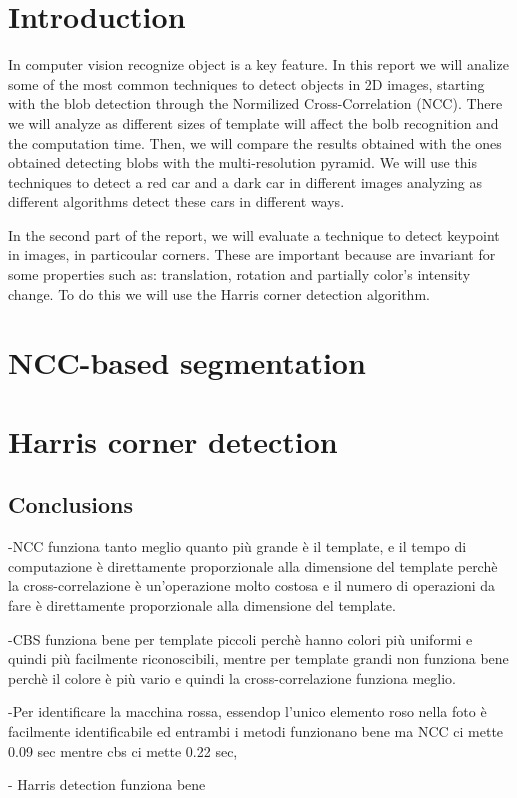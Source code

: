\chapter*{Introduction}

In computer vision recognize object is a key feature. In this report we will analize some of the most common techniques to detect objects in 2D images, starting with the blob detection through the Normilized Cross-Correlation (NCC). There we will analyze as different sizes of template will affect the bolb recognition and the computation time. Then, we will compare the results obtained with the ones obtained detecting blobs with the multi-resolution pyramid. We will use this techniques to detect a red car and a dark car in different images analyzing as different algorithms detect these cars in different ways.

In the second part of the report, we will evaluate a technique to detect keypoint in images, in particoular corners. These are important because are invariant for some properties such as: translation, rotation and partially color's intensity change. To do this we will use the Harris corner detection algorithm.
\chapter{NCC-based segmentation}



\chapter{Harris corner detection}


\newpage
\section*{Conclusions}


-NCC funziona tanto meglio quanto più grande è il template, e il tempo di computazione è direttamente proporzionale alla dimensione del template perchè la cross-correlazione è un'operazione molto costosa e il numero di operazioni da fare è direttamente proporzionale alla dimensione del template.

-CBS funziona bene per template piccoli perchè hanno colori più uniformi e quindi più facilmente riconoscibili, mentre per template grandi non funziona bene perchè il colore è più vario e quindi la cross-correlazione funziona meglio.

-Per identificare la macchina rossa, essendop l'unico elemento roso nella foto  è facilmente identificabile ed entrambi i metodi funzionano bene ma NCC ci mette 0.09 sec mentre cbs ci mette 0.22 sec, 

- Harris detection funziona bene

